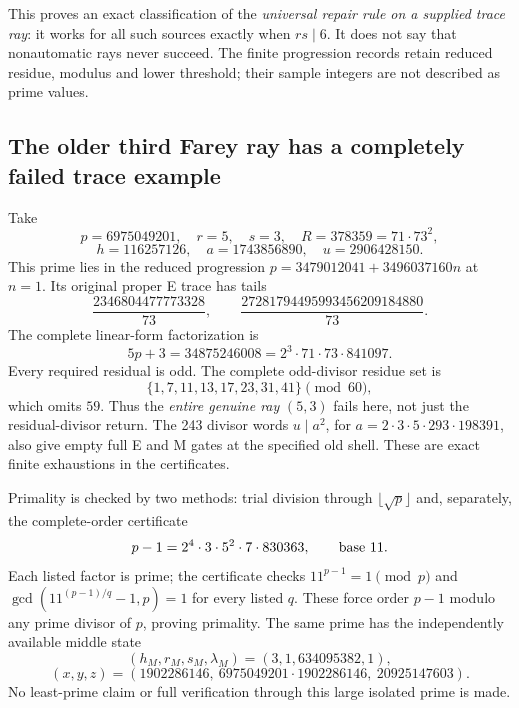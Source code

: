 This proves an exact classification of the \emph{universal repair rule on a
supplied trace ray}: it works for all such sources exactly when $rs\mid6$.
It does not say that nonautomatic rays never succeed. The finite progression
records retain reduced residue, modulus and lower threshold; their sample
integers are not described as prime values.

\subsection{The older third Farey ray has a completely failed trace example}
Take
\[
 p=6975049201,\quad r=5,\quad s=3,\quad
 R=378359=71\cdot73^2,
\]
\[
 h=116257126,\quad a=1743856890,\quad u=2906428150.
\]
This prime lies in the reduced progression
$p=3479012041+3496037160n$ at $n=1$. Its original proper E trace has tails
\[
 \frac{2346804477773328}{73},\qquad
 \frac{27281794495993456209184880}{73}.
\]
The complete linear-form factorization is
\[
 5p+3=34875246008=2^3\cdot71\cdot73\cdot841097.
\]
Every required residual is odd. The complete odd-divisor residue set is
\[
 \{1,7,11,13,17,23,31,41\}\pmod{60},
\]
which omits $59$. Thus the \emph{entire genuine ray} $(5,3)$ fails here, not
just the residual-divisor return. The 243 divisor words \(u\mid a^2\), for
$a=2\cdot3\cdot5\cdot293\cdot198391$, also give empty full E and M gates at
the specified old shell. These are exact finite exhaustions in the certificates.

Primality is checked by two methods: trial division through $\lfloor\sqrt p\rfloor$
and, separately, the complete-order certificate
\[
 p-1=2^4\cdot3\cdot5^2\cdot7\cdot830363,\qquad\hbox{base }11.
\]
Each listed factor is prime; the certificate checks $11^{p-1}=1\pmod p$ and
$\gcd(11^{(p-1)/q}-1,p)=1$ for every listed $q$. These force order $p-1$ modulo
any prime divisor of $p$, proving primality. The same prime has the independently
available middle state
\[
 (h_M,r_M,s_M,\lambda_M)=(3,1,634095382,1),
\]
\[
 (x,y,z)=(1902286146,\ 6975049201\cdot1902286146,\ 20925147603).
\]
No least-prime claim or full verification through this large isolated prime is made.

